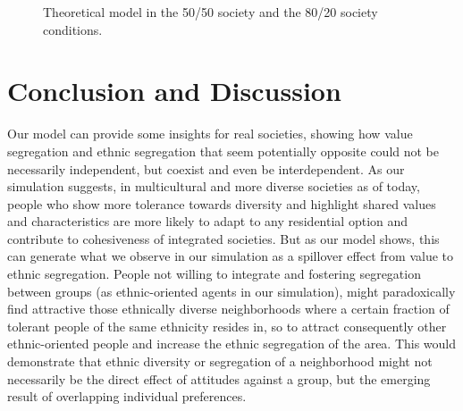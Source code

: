 \documentclass{ws-acs}
\begin{document}
\begin{figure}[th]
\centerline{}
\vspace*{8pt}
\caption{Theoretical model in the 50/50 society and the 80/20 society conditions.}
\label{fig:Modelconditions}
\end{figure}

\section{Conclusion and Discussion}

Our model can provide some insights for real societies, showing how value segregation and ethnic segregation that seem potentially opposite could not be necessarily independent, but coexist and even be interdependent. As our simulation suggests, in multicultural and more diverse societies as of today, people who show more tolerance towards diversity and highlight shared values and characteristics are more likely to adapt to any residential option and contribute to cohesiveness of integrated societies. But as our model shows, this can  generate what we observe in our simulation as a spillover effect from value to ethnic segregation. People not willing to integrate and fostering segregation between groups (as ethnic-oriented agents in our simulation), might paradoxically find attractive those ethnically diverse neighborhoods where a certain fraction of tolerant people of the same ethnicity resides in, so to attract consequently other ethnic-oriented people and increase  the ethnic segregation of the area. This would demonstrate that ethnic diversity or segregation of a neighborhood might not necessarily be the direct effect of attitudes against a group, but the emerging result of overlapping individual preferences.
\end{document}
